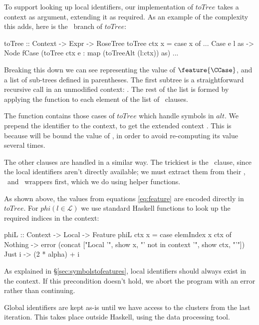To support looking up local identifiers, our implementation of $toTree$ takes a
context as argument, extending it as required. As an example of the complexity
this adds, here is the \CCase\ branch of $toTree$:

\begin{haskell}
toTree :: Context -> Expr -> RoseTree
toTree ctx x = case x of
  ...
  Case e l as -> Node fCase (toTree ctx e : map (toTreeAlt (l:ctx)) as)
  ...
\end{haskell}

Breaking this down we can see  representing the value of
$\feature{\CCase}$, and a list of sub-trees defined in parentheses. The first
subtree is a straightforward recursive call in an unmodified context:
\mbox{}. The rest of the list is formed by applying the
function \mbox{} to each element of the list  of
\CAlt\ clauses.

The  function contains those cases of $toTree$ which handle
symbols in $alt$. We prepend the identifier  to the context, to get the
extended context . This is because  will be bound the value of
, in order to avoid re-computing its value several times.

The other clauses are handled in a similar way. The trickiest is the \CLet\
clause, since the local identifiers aren't directly available; we must extract
them from their \CRec, \CNonRec\ and \CBind\ wrappers first, which we do using
helper functions.

As shown above, the values from equations \ref{eq:feature} are encoded directly
in $toTree$. For $phi(l \in \mathcal{L})$ we use standard Haskell functions to
look up the required indices in the context:

\begin{haskell}
phiL :: Context -> Local -> Feature
phiL ctx x = case elemIndex x ctx of
  Nothing -> error (concat ["Local '", show x,
                            "' not in context '",
                            show ctx, "'"])
  Just i  -> (2 * alpha) + i
\end{haskell}

As explained in \S \ref{sec:symbolstofeatures}, local identifiers should always
exist in the context. If this precondition doesn't hold, we abort the program
with an error rather than continuing.

Global identifiers are kept as-is until we have access to the clusters from the
last iteration. This takes place outside Haskell, using the \hs{jq} data
processing tool.

